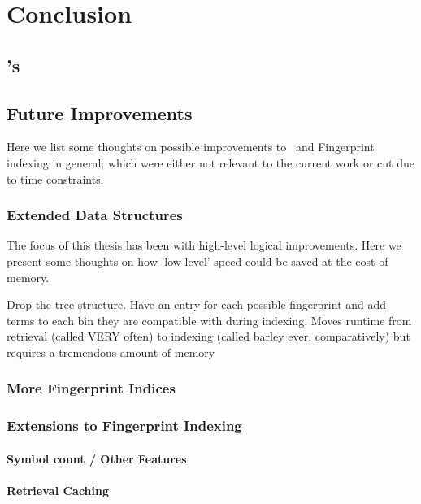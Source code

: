 
\chapter{Conclusion}
\label{cha:conclusion}

\section{\Beagle's }
\label{sec:why}

\section{Future Improvements}
\label{sec:future}

Here we list some thoughts on possible improvements to \beagle\ and Fingerprint
indexing in general; which were either not relevant to the current work or
cut due to time constraints.

\subsection{Extended Data Structures}
The focus of this thesis has been with high-level logical improvements. Here
we present some thoughts on how 'low-level' speed could be saved at the cost of memory.

Drop the tree structure. Have an entry for each possible fingerprint and add terms
to each bin they are compatible with during indexing. Moves runtime from
retrieval (called VERY often) to indexing (called barley ever, comparatively) but requires a
tremendous amount of memory

\subsection{More Fingerprint Indices}

\subsection{Extensions to Fingerprint Indexing}

\subsubsection{Symbol count / Other Features}
\subsubsection{Retrieval Caching}
